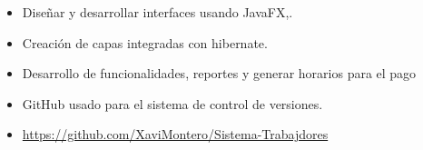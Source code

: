 \documentclass[10pt,a4paper,ragged2e]{altacv}
\begin{document}
\vspace{10px}

\begin{itemize}
   \item Diseñar y desarrollar interfaces usando JavaFX,.
   \item Creación de capas integradas con hibernate.
   \item Desarrollo de funcionalidades, reportes y generar horarios para el pago 
   \item GitHub usado para el sistema de control de versiones.
   \item \url{https://github.com/XaviMontero/Sistema-Trabajdores}
\end{itemize}
\vspace{10px}
 


\clearpage
\end{document}
